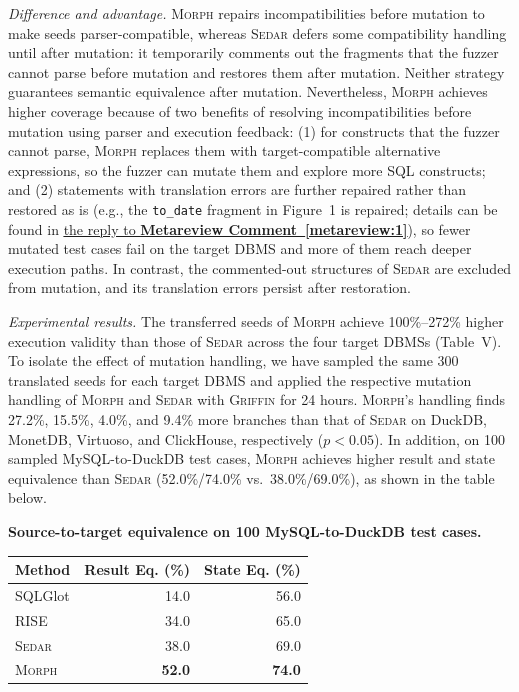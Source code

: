 \documentclass[12pt,letterpaper]{article}
\renewcommand{\arraystretch}{1.15}
\newcommand{\morph}{\textsc{Morph}}
\newcommand{\sedar}{\textsc{Sedar}}
\newcommand{\griffin}{\textsc{Griffin}}
\newcommand{\tool}{\morph}
\newcommand{\metareviewref}[1]{\hyperref[metareview:#1]{\uline{the reply to \textbf{Metareview Comment~\ref*{metareview:#1}}}}}
\begin{document}
\textit{Difference and advantage.} \tool{} repairs incompatibilities before mutation to make seeds parser-compatible, whereas \sedar{} defers some compatibility handling until after mutation: it temporarily comments out the fragments that the fuzzer cannot parse before mutation and restores them after mutation. Neither strategy guarantees semantic equivalence after mutation. Nevertheless, \tool{} achieves higher coverage because of two benefits of resolving incompatibilities before mutation using parser and execution feedback: (1) for constructs that the fuzzer cannot parse, \tool{} replaces them with target-compatible alternative expressions, so the fuzzer can mutate them and explore more SQL constructs; and (2) statements with translation errors are further repaired rather than restored as is (e.g., the \texttt{to\_date} fragment in Figure~1 is repaired; details can be found in \metareviewref{1}), so fewer mutated test cases fail on the target DBMS and more of them reach deeper execution paths. In contrast, the commented-out structures of \sedar{} are excluded from mutation, and its translation errors persist after restoration.

\textit{Experimental results.} The transferred seeds of \tool{} achieve 100\%--272\% higher execution validity than those of \sedar{} across the four target DBMSs (Table~V). To isolate the effect of mutation handling, we have sampled the same 300 translated seeds for each target DBMS and applied the respective mutation handling of \tool{} and \sedar{} with \griffin{} for 24 hours. \tool{}'s handling finds 27.2\%, 15.5\%, 4.0\%, and 9.4\% more branches than that of \sedar{} on DuckDB, MonetDB, Virtuoso, and ClickHouse, respectively ($p<0.05$). In addition, on 100 sampled MySQL-to-DuckDB test cases, \tool{} achieves higher result and state equivalence than \sedar{} (52.0\%/74.0\% vs.\ 38.0\%/69.0\%), as shown in the table below.

\begin{center}
\begin{minipage}{0.55\linewidth}
\centering\scriptsize\renewcommand{\arraystretch}{1.0}
\textbf{Source-to-target equivalence on 100 MySQL-to-DuckDB test cases.}
\par\smallskip
\begin{tabular}{lrr}
\toprule
Method & Result Eq. (\%) & State Eq. (\%) \\
\midrule
SQLGlot & 14.0 & 56.0 \\
RISE & 34.0 & 65.0 \\
\sedar{} & 38.0 & 69.0 \\
\tool{} & \textbf{52.0} & \textbf{74.0} \\
\bottomrule
\end{tabular}
\end{minipage}
\end{center}
\end{document}
